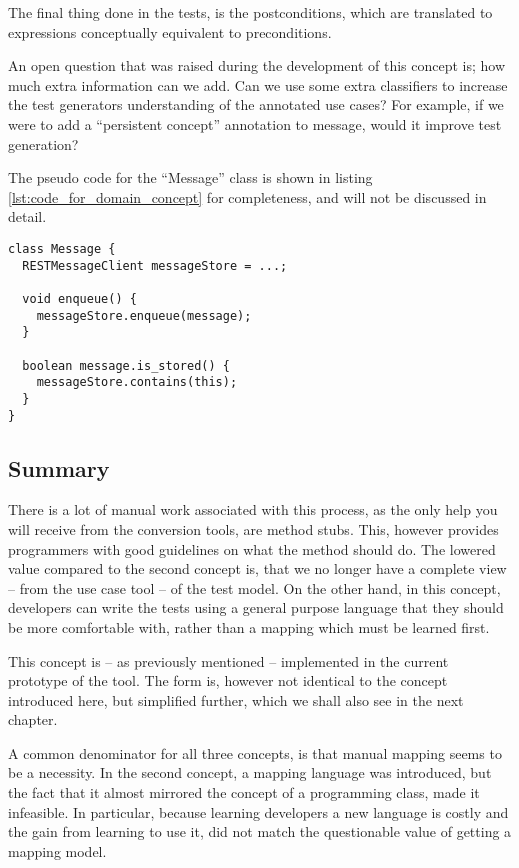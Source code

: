 \noindent The final thing done in the tests, is the postconditions, which are translated to expressions conceptually equivalent to preconditions.\medskip

\noindent An open question that was raised during the development of this concept is; how much extra information can we add. Can we use some extra classifiers to increase the test generators understanding of the annotated use cases? For example, if we were to add a ``persistent concept'' annotation to message, would it improve test generation?\medskip

\noindent The pseudo code for the ``Message'' class is shown in listing \ref{lst:code_for_domain_concept} for completeness, and will not be discussed in detail.
\begin{lstlisting}[style=Dart, caption=Pseudo code representing Message domain concept,label={lst:code_for_domain_concept}]
class Message {
  RESTMessageClient messageStore = ...;
  
  void enqueue() {
    messageStore.enqueue(message);
  }

  boolean message.is_stored() {
    messageStore.contains(this);
  }
}
\end{lstlisting}
\subsection{Summary}
There is a lot of manual work associated with this process, as the only help you will receive from the conversion tools, are method stubs. This, however provides programmers with good guidelines on what the method should do. The lowered value compared to the second concept is, that we no longer have a complete view -- from the use case tool -- of the test model. On the other hand, in this concept, developers can write the tests using a general purpose language that they should be more comfortable with, rather than a mapping which must be learned first.\medskip

\noindent This concept is -- as previously mentioned -- implemented in the current prototype of the tool. The form is, however not identical to the concept introduced here, but simplified further, which we shall also see in the next chapter.\medskip

\noindent A common denominator for all three concepts, is that manual mapping seems to be a necessity. In the second concept, a mapping language was introduced, but the fact that it almost mirrored the concept of a programming class, made it infeasible. In particular, because learning developers a new language is costly and the gain from learning to use it, did not match the questionable value of getting a mapping model.